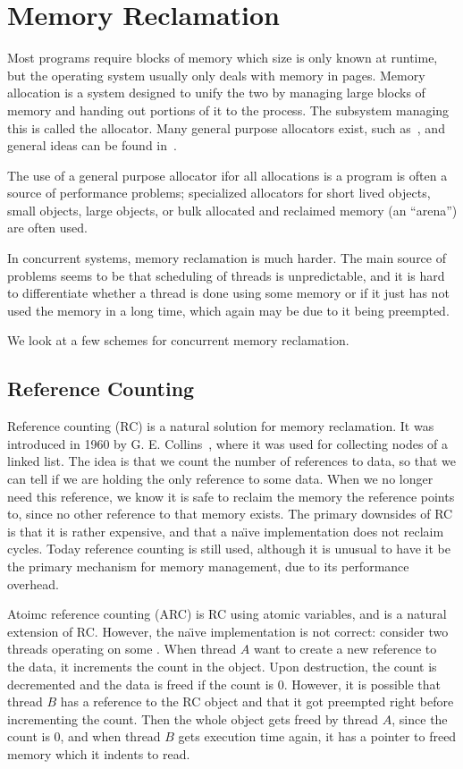 \section{Memory Reclamation}

Most programs require blocks of memory which size is only known at runtime, but the operating
system usually only deals with memory in pages. Memory allocation is a system designed to unify the
two by managing large blocks of memory and handing out portions of it to the process. The subsystem
managing this is called the allocator. Many general purpose allocators exist, such as~\cite{glibc-malloc,jemalloc,tcmalloc}, and general ideas can be found in~\cite{knuth1997vol1}.

The use of a general purpose allocator ifor all allocations is a program is often a source of
performance problems; specialized allocators for short lived objects, small objects, large objects,
or bulk allocated and reclaimed memory (an ``arena'') are often used.

In concurrent systems, memory reclamation is much harder. The main source of problems seems to be
that scheduling of threads is unpredictable, and it is hard to differentiate whether a thread is
done using some memory or if it just has not used the memory in a long time, which again may be due
to it being preempted.

We look at a few schemes for concurrent memory reclamation.


\subsection{Reference Counting\label{sec:background-rc}}

Reference counting (RC) is a natural solution for memory reclamation. It was introduced in 1960 by
G. E.  Collins~\cite{collins1960method}, where it was used for collecting nodes of a linked list.
The idea is that we count the number of references to data, so that we can tell if we are holding
the only reference to some data. When we no longer need this reference, we know it is safe to
reclaim the memory the reference points to, since no other reference to that memory exists. The
primary downsides of RC is that it is rather expensive, and that a na\"\i{}ve implementation does
not reclaim cycles. Today reference counting is still used, although it is unusual to have it be
the primary mechanism for memory management, due to its performance overhead.

Atoimc reference counting (ARC) is RC using atomic variables, and is a natural extension of RC\@.
However, the na\"\i{}ve implementation is not correct: consider two threads operating on some
. When thread $A$ want to create a new reference to the data, it increments the count
in the  object. Upon destruction, the count is decremented and the data is freed if the
count is 0. However, it is possible that thread $B$ has a reference to the RC object and that it
got preempted right before incrementing the count. Then the whole object gets freed by thread $A$,
since the count is 0, and when thread $B$ gets execution time again, it has a pointer to freed
memory which it indents to read.

